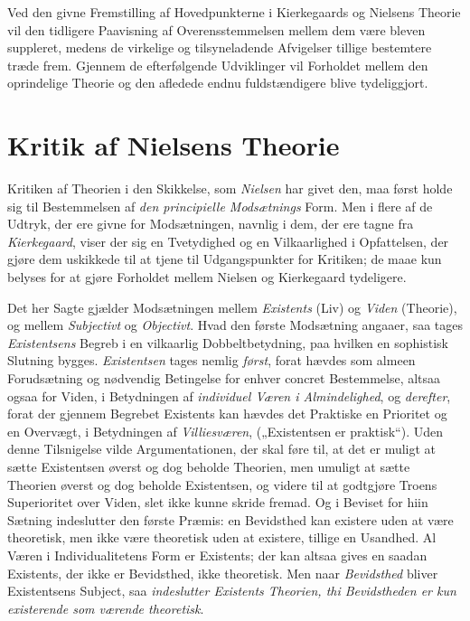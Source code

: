 \documentclass[12pt,a4paper]{book}
\newcommand{\opage}[1]{\marginnote{\footnotesize\textit{[#1]}}}
\begin{document}
Ved den givne Fremstilling af Hovedpunkterne i Kierkegaards og Nielsens
Theorie vil den tidligere Paavisning af Overensstemmelsen mellem dem
være bleven suppleret, medens de virkelige og tilsyneladende Afvigelser
tillige bestemtere træde frem. Gjennem de efterfølgende Udviklinger vil
Forholdet mellem den oprindelige Theorie og den afledede endnu
fuldstændigere blive tydeliggjort.

\section{Kritik af Nielsens Theorie}
\label{sec:nielsen-kritik}

Kritiken af Theorien i den Skikkelse, som \emph{Nielsen} har givet den, maa
først holde sig til Bestemmelsen af \emph{den principielle Modsætnings} Form.
Men i flere af de Udtryk, der ere givne for Modsætningen, navnlig i
dem, der ere tagne fra \emph{Kierkegaard}, viser der sig en Tvetydighed og en
Vilkaarlighed i Opfattelsen, der gjøre dem uskikkede til at tjene til
Udgangspunkter for Kritiken; de maae kun belyses for at gjøre
Forholdet mellem Nielsen og Kierkegaard tydeligere.

Det her Sagte gjælder Modsætningen mellem \emph{Existents} (Liv) og \emph{Viden} (Theorie), og mellem \emph{Subjectivt} og \emph{Objectivt}. Hvad den første
Modsætning angaaer, saa tages \emph{Existentsens} Begreb i en vilkaarlig
Dobbeltbetydning, paa hvilken en sophistisk Slutning bygges.
\emph{Existentsen} tages nemlig \emph{først}, forat hævdes som almeen Forudsætning
og nødvendig Betingelse for enhver concret Bestemmelse, altsaa ogsaa
for Viden, i Betydningen af \emph{individuel Væren i Almindelighed}, og \emph{derefter}, forat der gjennem Begrebet Existents kan hævdes det Praktiske
en Prioritet og en Overvægt, i Betydningen af \emph{Villiesværen}, („Existentsen er
praktisk“). Uden denne Tilsnigelse vilde Argumentationen, der skal føre til, at det er
muligt at sætte Existentsen øverst og dog beholde Theorien, men umuligt at sætte Theorien
øverst og dog beholde Existentsen, og \opage{131}videre til at godtgjøre Troens Superioritet over
Viden, slet ikke kunne skride fremad. Og i Beviset for hiin Sætning indeslutter den første
Præmis: en Bevidsthed kan existere uden at være theoretisk, men ikke være theoretisk uden at existere, tillige en Usandhed. Al Væren i Individualitetens Form er Existents; der
kan altsaa gives en saadan Existents, der ikke er Bevidsthed, ikke theoretisk. Men naar
\emph{Bevidsthed} bliver Existentsens Subject, saa \emph{indeslutter Existents Theorien, thi
Bevidstheden er kun existerende som værende theoretisk}.
\end{document}
